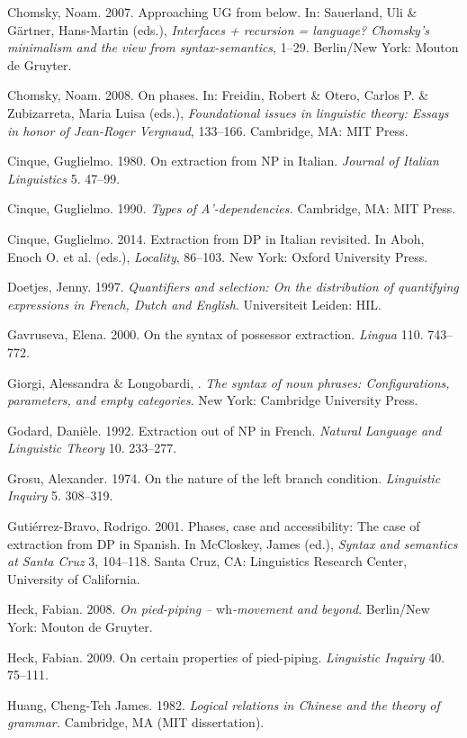 \documentclass[output=paper]{langsci/langscibook}
\begin{document}
Chomsky, Noam. 2007. Approaching UG from below. In: Sauerland, Uli \& Gärtner, Hans-Martin (eds.), \textit{Interfaces + recursion = language? Chomsky’s minimalism and the view from syntax-semantics}, 1–29. Berlin/New York: Mouton de Gruyter.

Chomsky, Noam. 2008. On phases. In: Freidin, Robert \& Otero, Carlos P. \& Zubizarreta, Maria Luisa (eds.), \textit{Foundational issues in linguistic theory: Essays in honor of Jean-Roger Vergnaud}, 133–166. Cambridge, MA: MIT Press.

Cinque, Guglielmo. 1980. On extraction from NP in Italian. \textit{Journal of Italian Linguistics} 5. 47–99.

Cinque, Guglielmo. 1990. \textit{Types of A’-dependencies.} Cambridge, MA: MIT Press.

Cinque, Guglielmo. 2014. Extraction from DP in Italian revisited. In Aboh, Enoch O. et al. (eds.), \textit{Locality}, 86–103. New York: Oxford University Press.

Doetjes, Jenny. 1997. \textit{Quantifiers and selection: On the distribution of quantifying expressions in French, Dutch and English}. Universiteit Leiden: HIL.

Gavruseva, Elena. 2000. On the syntax of possessor extraction. \textit{Lingua} 110. 743–772.

Giorgi, Alessandra \& Longobardi, \citealt{Giuseppe1991}. \textit{The syntax of noun phrases: Configurations, parameters, and empty categories}. New York: Cambridge University Press.

Godard, Danièle. 1992. Extraction out of NP in French. \textit{Natural Language and Linguistic Theory} 10. 233–277.

Grosu, Alexander. 1974. On the nature of the left branch condition. \textit{Linguistic Inquiry} 5. 308–319.

Gutiérrez-Bravo, Rodrigo. 2001. Phases, case and accessibility: The case of extraction from DP in Spanish. In McCloskey, James (ed.), \textit{Syntax and semantics at Santa Cruz} 3, 104–118. Santa Cruz, CA: Linguistics Research Center, University of California.

Heck, Fabian. 2008. \textit{On pied-piping –} wh\textit{{}-movement and beyond}. Berlin/New York: Mouton de Gruyter.

Heck, Fabian. 2009. On certain properties of pied-piping. \textit{Linguistic Inquiry} 40. 75–111.

Huang, Cheng-Teh James. 1982. \textit{Logical relations in Chinese and the theory of grammar.} Cambridge, MA (MIT dissertation).
\end{document}
